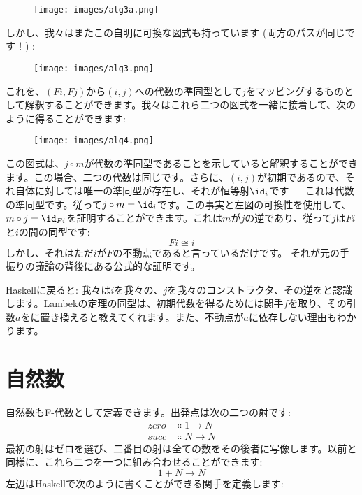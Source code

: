 \begin{figure}[H]
  \centering
  \texttt{[image: images/alg3a.png]}
\end{figure}

\noindent
しかし、我々はまたこの自明に可換な図式も持っています (両方のパスが同じです！) : 

\begin{figure}[H]
  \centering
  \texttt{[image: images/alg3.png]}
\end{figure}

\noindent
これを、$(F i, F j)$から$(i, j)$への代数の準同型として$j$をマッピングするものとして解釈することができます。我々はこれら二つの図式を一緒に接着して、次のように得ることができます: 

\begin{figure}[H]
  \centering
  \texttt{[image: images/alg4.png]}
\end{figure}

\noindent
この図式は、$j \circ m$が代数の準同型であることを示していると解釈することができます。この場合、二つの代数は同じです。さらに、$(i, j)$が初期であるので、それ自体に対しては唯一の準同型が存在し、それが恒等射$\id_i$です --- これは代数の準同型です。従って$j \circ m = \id_i$です。この事実と左図の可換性を使用して、$m \circ j = \id_{Fi}$を証明することができます。これは$m$が$j$の逆であり、従って$j$は$F i$と$i$の間の同型です: 
\[F i \cong i\]
しかし、それはただ$i$が$F$の不動点であると言っているだけです。
それが元の手振りの議論の背後にある公式的な証明です。

Haskellに戻ると: 我々は$i$を我々の、$j$を我々のコンストラクタ、その逆をと認識します。Lambekの定理の同型は、初期代数を得るためには関手$f$を取り、その引数$a$をに置き換えると教えてくれます。また、不動点が$a$に依存しない理由もわかります。

\section{自然数}

自然数もF-代数として定義できます。出発点は次の二つの射です: 
\begin{align*}
  zero & \Colon 1 \to N \\
  succ & \Colon N \to N
\end{align*}
最初の射はゼロを選び、二番目の射は全ての数をその後者に写像します。以前と同様に、これら二つを一つに組み合わせることができます: 
\[1 + N \to N\]
左辺はHaskellで次のように書くことができる関手を定義します: 

